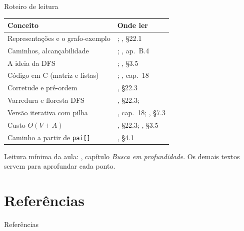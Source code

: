 \documentclass[aspectratio=169]{beamer}
\begin{document}
\begin{frame}{Roteiro de leitura}
  \begin{center}
  {\scriptsize
  \begin{tabular}{ll}
    \toprule
    \textbf{Conceito} & \textbf{Onde ler} \\
    \midrule
    Representações e o grafo-exemplo    & \cite{feofiloff2020algoritmos}; \cite{cormen2009introduction}, §22.1 \\
    Caminhos, alcançabilidade           & \cite{feofiloff2011teoriagrafos}; \cite{cormen2009introduction}, ap.~B.4 \\
    A ideia da DFS                      & \cite{feofiloff2020algoritmos}; \cite{levitin2012introduction}, §3.5 \\
    Código em C (matriz e listas)       & \cite{feofiloff2020algoritmos}; \cite{sedgewick2002algorithms}, cap.~18 \\
    Corretude e pré-ordem               & \cite{cormen2009introduction}, §22.3 \\
    Varredura e floresta DFS            & \cite{cormen2009introduction}, §22.3; \cite{tarjan1972depth} \\
    Versão iterativa com pilha          & \cite{sedgewick2002algorithms}, cap.~18; \cite{ziviani2011projeto}, §7.3 \\
    Custo $\Theta(V+A)$                 & \cite{cormen2009introduction}, §22.3; \cite{levitin2012introduction}, §3.5 \\
    Caminho a partir de \texttt{pai[]}  & \cite{sedgewick2011algorithms}, §4.1 \\
    \bottomrule
  \end{tabular}}
  \end{center}
  {\scriptsize Leitura mínima da aula: \cite{feofiloff2020algoritmos}, capítulo
  \emph{Busca em profundidade}. Os demais textos servem para aprofundar cada
  ponto.}
\end{frame}

\section*{Referências}
\begin{frame}[allowframebreaks]{Referências}
  \scriptsize
  \nocite{*}
  
  
\end{frame}
\end{document}
